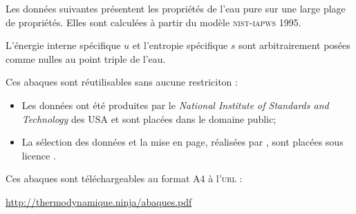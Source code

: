 Les données suivantes présentent les propriétés de l’eau pure sur une large plage de propriétés.
Elles sont calculées à partir du modèle \textsc{nist-iapws} 1995.

L’énergie interne spécifique $u$ et l’entropie spécifique $s$
sont arbitrairement posées comme nulles au point triple de l’eau.

Ces abaques sont réutilisables sans aucune restriciton :
\begin{itemize}
	\item Les données ont été produites par le \textit{National Institute of Standards and Technology} des USA et sont placées dans le domaine public;
	\item La sélection des données et la mise en page, réalisées par \olivier, sont placées sous licence \cczero.
\end{itemize}

Ces abaques sont téléchargeables au format A4 à l’\textsc{url} :
\begin{center}\href{http://thermodynamique.ninja/abaques.pdf}{http://thermodynamique.ninja/abaques.pdf}\end{center}
